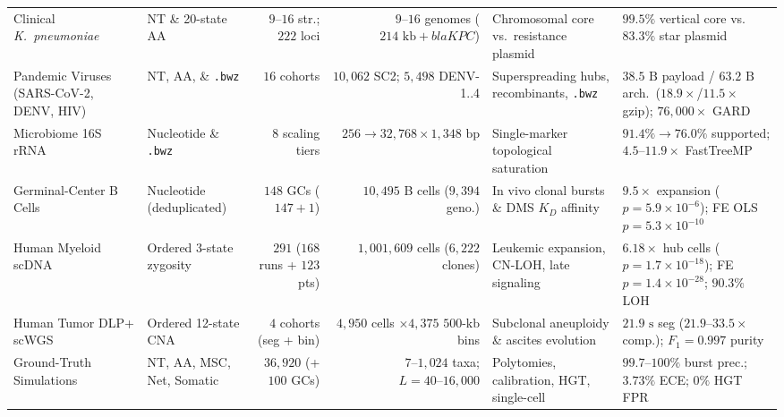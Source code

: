 \documentclass[12pt]{article}
\begin{document}
\begin{table}[H]
{\begin{tabular}{@{}llrrll@{}}
Clinical \textit{K.\ pneumoniae} \cite{wyres2020population} & NT \& 20-state AA & $9\text{--}16$ str.; $222$ loci & $9\text{--}16$ genomes ($214\text{ kb} + \textit{blaKPC}$) & Chromosomal core vs.\ resistance plasmid & $99.5\%$ vertical core vs.\ $83.3\%$ star plasmid \\
Pandemic Viruses (SARS-CoV-2, DENV, HIV) & NT, AA, \& \texttt{.bwz} & $16$ cohorts & $10,062$ SC2; $5,498$ DENV-1..4 & Superspreading hubs, recombinants, \texttt{.bwz} & $38.5\text{ B}$ payload / $63.2\text{ B}$ arch.\ ($18.9\times$/$11.5\times$ gzip); $76{,}000\times$ GARD \\
Microbiome 16S rRNA \cite{mcdonald2012greengenes} & Nucleotide \& \texttt{.bwz} & $8$ scaling tiers & $256 \to 32,768 \times 1{,}348\text{ bp}$ & Single-marker topological saturation & $91.4\% \to 76.0\%$ supported; $4.5\text{--}11.9\times$ FastTreeMP \\
Germinal-Center B Cells \cite{tas2016visualizing,dewitt2026gcreplay} & Nucleotide (deduplicated) & $148$ GCs ($147+1$) & $10,495$ B cells ($9,394$ geno.) & In vivo clonal bursts \& DMS $K_D$ affinity & $9.5\times$ expansion ($p=5.9\times 10^{-6}$); FE OLS $p=5.3\times 10^{-10}$ \\
Human Myeloid scDNA \cite{morita2020clonal,sollier2023compass} & Ordered 3-state zygosity & $291$ ($168$ runs + $123$ pts) & $1,001,609$ cells ($6,222$ clones) & Leukemic expansion, CN-LOH, late signaling & $6.18\times$ hub cells ($p=1.7\times 10^{-18}$); FE $p=1.4\times 10^{-28}$; $90.3\%$ LOH \\
Human Tumor DLP+ scWGS \cite{salehi2023sitka} & Ordered 12-state CNA & $4$ cohorts (seg + bin) & $4,950$ cells $\times 4{,}375$ $500\text{-kb}$ bins & Subclonal aneuploidy \& ascites evolution & $21.9\text{ s}$ seg ($21.9\text{--}33.5\times$ comp.); $F_1 = 0.997$ purity \\
Ground-Truth Simulations \cite{lytrong2022alisim,abadi2019model} & NT, AA, MSC, Net, Somatic & $36,920$ (+ $100$ GCs) & $7\text{--}1{,}024$ taxa; $L = 40\text{--}16{,}000$ & Polytomies, calibration, HGT, single-cell & $99.7\text{--}100\%$ burst prec.; $3.73\%$ ECE; $0\%$ HGT FPR \\
\bottomrule
\end{tabular}%
}
\end{table}
\end{document}

